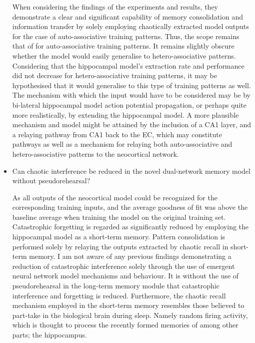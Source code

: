 \begin{itemize}
    When considering the findings of the experiments and results, they demonstrate a clear and significant capability of memory consolidation and information transfer by solely employing chaotically extracted model outputs for the case of auto-associative training patterns. Thus, the scope remains that of for auto-associative training patterns. It remains slightly obscure whether the model would easily generalise to hetero-associative patterns. Considering that the hippocampal model's extraction rate and performance did not decrease for hetero-associative training patterns, it may be hypothesised that it would generalise to this type of training patterns as well. The mechanism with which the input would have to be considered may be by bi-lateral hippocampal model action potential propagation, or perhaps quite more realistically, by extending the hippocampal model. A more plausible mechanism and model might be attained by the inclusion of a CA1 layer, and a relaying pathway from CA1 back to the EC, which may constitute pathways as well as a mechanism for relaying both auto-associative and hetero-associative patterns to the neocortical network.
    
    \item Can chaotic interference be reduced in the novel dual-network memory model without pseudorehearsal?
    
    As all outputs of the neocortical model could be recognized for the corresponding training inputs, and the average goodness of fit was above the baseline average when training the model on the original training set. Catastrophic forgetting is regarded as significantly reduced by employing the hippocampal model as a short-term memory. Pattern consolidation is performed solely by relaying the outputs extracted by chaotic recall in short-term memory. I am not aware of any previous findings demonstrating a reduction of catastrophic interference solely through the use of emergent neural network model mechanisms and behaviour. It is without the use of pseudorehearsal in the long-term memory module that catastrophic interference and forgetting is reduced. Furthermore, the chaotic recall mechanism employed in the short-term memory resembles those believed to part-take in the biological brain during sleep. Namely random firing activity, which is thought to process the recently formed memories of among other parts; the hippocampus.
    
\end{itemize}


